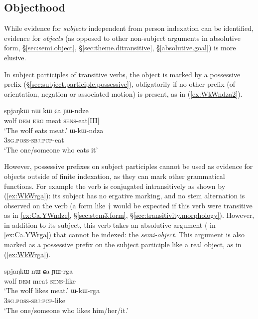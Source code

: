  \subsection{Objecthood}
 While evidence for \textit{subjects} independent from person indexation can be identified, evidence for \textit{objects} (as opposed to other non-subject arguments in absolutive form, §\ref{sec:semi.object}, §\ref{sec:theme.ditransitive}, §\ref{absolutive.goal}) is more elusive. 
 
In subject participles of transitive verbs, the object is marked by a possessive prefix  (§\ref{sec:subject.participle.possessive}), obligatorily if no other prefix (of orientation, negation or associated motion) is present, as in (\ref{ex:WkWndza2}).  

\begin{exe} 
\ex 
\begin{xlist}
\ex \label{ex:Ca.YWndze}
\gll spjaŋkɯ nɯ kɯ ɕa ɲɯ-ndze \\
wolf \textsc{dem} \textsc{erg} meat \textsc{sens}-eat[III] \\
\glt `The wolf eats meat.' 
\ex \label{ex:WkWndza2}
\gll ɯ-kɯ-ndza  \\
\textsc{3sg}.\textsc{poss}-\textsc{sbj}:\textsc{pcp}-eat \\
\glt `The one/someone who eats it' 
\end{xlist}
\end{exe}
 
However, possessive prefixes on subject participles cannot be used as evidence for objects outside of finite indexation, as they can mark other grammatical functions. For example the verb  is conjugated intransitively as shown by (\ref{ex:WkWrga}): its subject  has no ergative marking, and no stem alternation is observed on the verb (a form like $\dagger$ would be expected if this verb were transitive as in \ref{ex:Ca.YWndze}, §\ref{sec:stem3.form}, §\ref{sec:transitivity.morphology}). However, in addition to its subject, this verb takes an absolutive argument ( in \ref{ex:Ca.YWrga}) that cannot be indexed: the \textit{semi-object}. This argument is also marked as a possessive prefix on the subject participle like a real object, as in (\ref{ex:WkWrga}).
 
\begin{exe} 
\ex 
\begin{xlist}
\ex \label{ex:Ca.YWrga}
\gll spjaŋkɯ nɯ ɕa ɲɯ-rga \\
wolf \textsc{dem} meat \textsc{sens}-like \\
\glt `The wolf likes meat.' 
\ex \label{ex:WkWrga}
\gll ɯ-kɯ-rga  \\
\textsc{3sg}.\textsc{poss}-\textsc{sbj}:\textsc{pcp}-like \\
\glt `The one/someone who likes him/her/it.' 
\end{xlist}
\end{exe}
 
